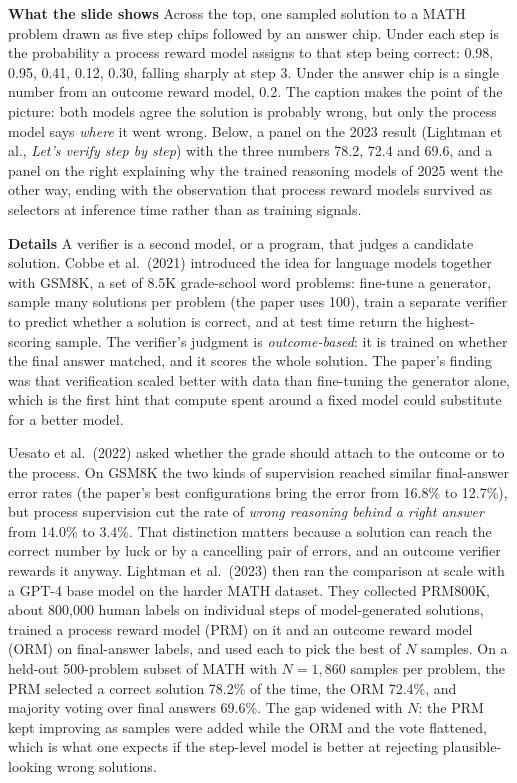 \documentclass[11pt,letterpaper]{article}
\newcommand{\para}[1]{\medskip\noindent\textbf{#1}\quad}
\newcommand{\paper}[1]{\textit{#1}}
\begin{document}
\para{What the slide shows} Across the top, one sampled solution to a MATH problem drawn as five step chips followed by an answer chip. Under each step is the probability a process reward model assigns to that step being correct: 0.98, 0.95, 0.41, 0.12, 0.30, falling sharply at step 3. Under the answer chip is a single number from an outcome reward model, 0.2. The caption makes the point of the picture: both models agree the solution is probably wrong, but only the process model says \emph{where} it went wrong. Below, a panel on the 2023 result (Lightman et al., \paper{Let's verify step by step}) with the three numbers 78.2, 72.4 and 69.6, and a panel on the right explaining why the trained reasoning models of 2025 went the other way, ending with the observation that process reward models survived as selectors at inference time rather than as training signals.

\para{Details} A verifier is a second model, or a program, that judges a candidate solution. Cobbe et al.\ (2021) introduced the idea for language models together with GSM8K, a set of 8.5K grade-school word problems: fine-tune a generator, sample many solutions per problem (the paper uses 100), train a separate verifier to predict whether a solution is correct, and at test time return the highest-scoring sample. The verifier's judgment is \emph{outcome-based}: it is trained on whether the final answer matched, and it scores the whole solution. The paper's finding was that verification scaled better with data than fine-tuning the generator alone, which is the first hint that compute spent around a fixed model could substitute for a better model.

Uesato et al.\ (2022) asked whether the grade should attach to the outcome or to the process. On GSM8K the two kinds of supervision reached similar final-answer error rates (the paper's best configurations bring the error from 16.8\% to 12.7\%), but process supervision cut the rate of \emph{wrong reasoning behind a right answer} from 14.0\% to 3.4\%. That distinction matters because a solution can reach the correct number by luck or by a cancelling pair of errors, and an outcome verifier rewards it anyway. Lightman et al.\ (2023) then ran the comparison at scale with a GPT-4 base model on the harder MATH dataset. They collected PRM800K, about 800,000 human labels on individual steps of model-generated solutions, trained a process reward model (PRM) on it and an outcome reward model (ORM) on final-answer labels, and used each to pick the best of $N$ samples. On a held-out 500-problem subset of MATH with $N=1{,}860$ samples per problem, the PRM selected a correct solution 78.2\% of the time, the ORM 72.4\%, and majority voting over final answers 69.6\%. The gap widened with $N$: the PRM kept improving as samples were added while the ORM and the vote flattened, which is what one expects if the step-level model is better at rejecting plausible-looking wrong solutions.
\end{document}
